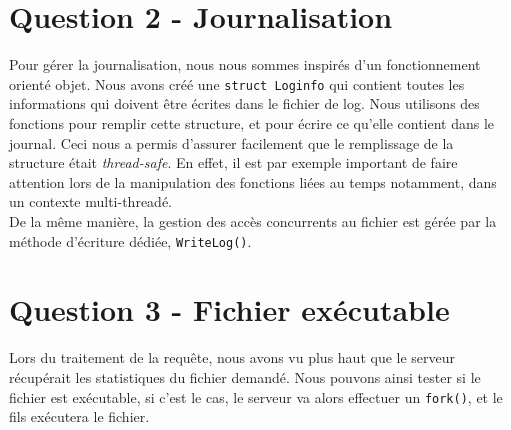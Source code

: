 \documentclass[final,12pt]{article}
\begin{document}
\section*{\textbf{Question 2} - Journalisation {\color{green}\checkmark}}
	Pour gérer la journalisation, nous nous sommes inspirés d'un fonctionnement orienté objet.
	Nous avons créé une \texttt{struct Loginfo} qui contient toutes les informations qui doivent être écrites dans le fichier de log. Nous utilisons des fonctions pour remplir cette structure, et pour écrire ce qu'elle contient dans le journal. Ceci nous a permis d'assurer facilement que le remplissage de la structure était \textit{thread-safe}. En effet, il est par exemple important de faire attention lors de la manipulation des fonctions liées au temps notamment, dans un contexte multi-threadé.\\
	De la même manière, la gestion des accès concurrents au fichier est gérée par la méthode d'écriture dédiée, \texttt{WriteLog()}.

\section*{\textbf{Question 3} - Fichier exécutable {\color{green}\checkmark}}
	Lors du traitement de la requête, nous avons vu plus haut que le serveur récupérait les statistiques du fichier demandé. Nous pouvons ainsi tester si le fichier est exécutable, si c'est le cas, le serveur va alors effectuer un \texttt{fork()}, et le fils exécutera le fichier.
	
\end{document}
